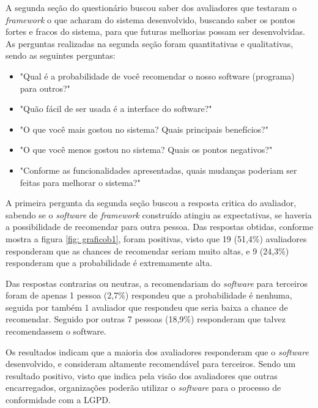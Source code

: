\documentclass[
	12pt,				%
	openright,			%
	oneside,			%
	a4paper,			%
	english,			%
	french,				%
	spanish,			%
	brazil,				%
	]{abntex2}
\begin{document}
A segunda seção do questionário buscou saber dos avaliadores que testaram o \textit{framework} o que acharam do sistema desenvolvido, buscando saber os pontos fortes e fracos do sistema, para que futuras melhorias possam ser desenvolvidas.
As perguntas realizadas na segunda seção foram quantitativas e qualitativas, sendo as seguintes perguntas:
\begin{itemize}
 
 \item "Qual é a probabilidade de você recomendar o nosso software (programa) para outros?"
 \item "Quão fácil de ser usada é a interface do software?"
 \item "O que você mais gostou no sistema? Quais principais benefícios?"
 \item "O que você menos gostou no sistema? Quais os pontos negativos?"
 \item "Conforme as funcionalidades apresentadas, quais mudanças poderiam ser feitas para melhorar o sistema?"

\end{itemize}

A primeira pergunta da segunda seção buscou a resposta critica do avaliador, sabendo se o \textit{software} de \textit{framework} construído atingiu as expectativas, se haveria a possibilidade de recomendar para outra pessoa.
Das respostas obtidas, conforme mostra a figura \ref{fig: graficob1}, foram positivas, visto que 19 (51,4\%) avaliadores responderam que as chances de recomendar seriam muito altas, e 9 (24,3\%) responderam que a probabilidade é extremamente alta.

Das respostas contrarias ou neutras, a recomendariam do \textit{software} para terceiros foram de apenas 1 pessoa (2,7\%) respondeu que a probabilidade é nenhuma, seguida por também 1 avaliador que respondeu que seria baixa a chance de recomendar. Seguido por outras 7 pessoas (18,9\%) responderam que talvez recomendassem o software. 

Os resultados indicam que a maioria dos avaliadores responderam que o \textit{software} desenvolvido, e consideram altamente recomendável para terceiros. Sendo um resultado positivo, visto que indica pela visão dos avaliadores que outras encarregados, organizações poderão utilizar o \textit{software} para o processo de conformidade com a LGPD.
\end{document}
